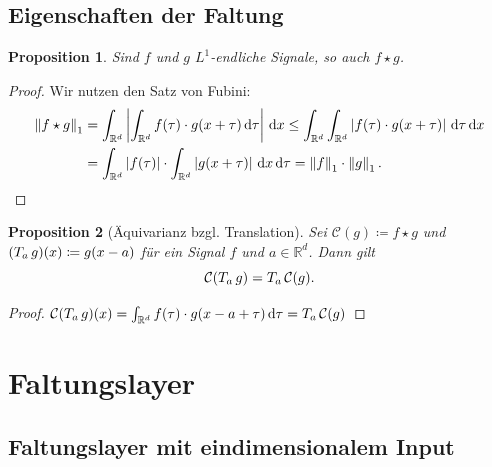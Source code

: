 \documentclass[envcountsect, smaller, aspectratio=149]{beamer}
\newtheorem{proposition}{Proposition}
\newcommand{\diff}{\,\textrm{d}}
\newcommand{\R}{\mathbb{R}}
\newcommand{\norm}[1]{\left\lVert#1\right\rVert}
\newcommand{\abs}[1]{\left\lvert#1\right\rvert}
\begin{document}
\subsection{Eigenschaften der Faltung}
\begin{frame}
    \begin{proposition}
        Sind $f$ und $g$ $L^1$-endliche Signale, so auch $f\star g$.
    \end{proposition}
    \pause
    \begin{proof}
        Wir nutzen den Satz von Fubini:
        \begin{align*}
            \norm{f \star g}_1
            &= \int_{\R^d} \abs{ \int_{\R^d} f(\tau)\cdot g(x + \tau) \diff\tau }\diff x
            \leq \int_{\R^d}  \int_{\R^d} \abs{f(\tau)\cdot g(x + \tau)} \diff\tau \diff x\\
            &= \int_{\R^d} \abs{f(\tau)} \cdot \int_{\R^d} \abs{g(x+\tau)} \diff x \diff\tau
            = \norm{f}_1 \cdot \norm{g}_1 \qedhere.
        \end{align*}
    \end{proof}
    \pause
    \begin{proposition}[Äquivarianz bzgl. Translation]
        Sei $\mathcal{C}(g)\coloneqq f\star g$ und $(T_{a}\, g)(x) \coloneqq g(x - a)$ für ein Signal $f$ und $a\in\R^d$.
        Dann gilt \[ \mathcal{C}(T_{a}\, g) = T_{a}\, \mathcal{C}(g). \]
    \end{proposition}
    \pause
    \begin{proof}
        $\mathcal{C}(T_a\, g)(x) = \int_{\R^d} f(\tau) \cdot g(x - a + \tau) \diff \tau = \transl{a}{\mathcal{C}(g)}$
    \end{proof}
\end{frame}


\section{Faltungslayer}

\subsection{Faltungslayer mit eindimensionalem Input}
\end{document}

